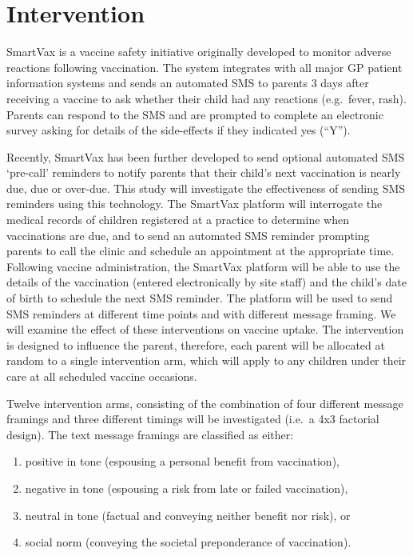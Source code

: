 \documentclass[
  bibliography=totoc]{scrreprt}
\providecommand{\tightlist}{%
  \setlength{\itemsep}{0pt}\setlength{\parskip}{0pt}}
\begin{document}
\hypertarget{intervention}{%
\section{Intervention}\label{intervention}}

SmartVax is a vaccine safety initiative originally developed to monitor adverse reactions following vaccination.
The system integrates with all major GP patient information systems and sends an automated SMS to parents 3 days after receiving a vaccine to ask whether their child had any reactions (e.g.~fever, rash).
Parents can respond to the SMS and are prompted to complete an electronic survey asking for details of the side-effects if they indicated yes (``Y'').

Recently, SmartVax has been further developed to send optional automated SMS `pre-call' reminders to notify parents that their child's next vaccination is nearly due, due or over-due.
This study will investigate the effectiveness of sending SMS reminders using this technology.
The SmartVax platform will interrogate the medical records of children registered at a practice to determine when vaccinations are due, and to send an automated SMS reminder prompting parents to call the clinic and schedule an appointment at the appropriate time.
Following vaccine administration, the SmartVax platform will be able to use the details of the vaccination (entered electronically by site staff) and the child's date of birth to schedule the next SMS reminder.
The platform will be used to send SMS reminders at different time points and with different message framing.
We will examine the effect of these interventions on vaccine uptake.
The intervention is designed to influence the parent, therefore, each parent will be allocated at random to a single intervention arm, which will apply to any children under their care at all scheduled vaccine occasions.

Twelve intervention arms, consisting of the combination of four different message framings and three different timings will be investigated (i.e.~a 4x3 factorial design).
The text message framings are classified as either:

\begin{enumerate}
\def\labelenumi{\arabic{enumi}.}
\tightlist
\item
  positive in tone (espousing a personal benefit from vaccination),
\item
  negative in tone (espousing a risk from late or failed vaccination),
\item
  neutral in tone (factual and conveying neither benefit nor risk), or
\item
  social norm (conveying the societal preponderance of vaccination).
\end{enumerate}
\end{document}

